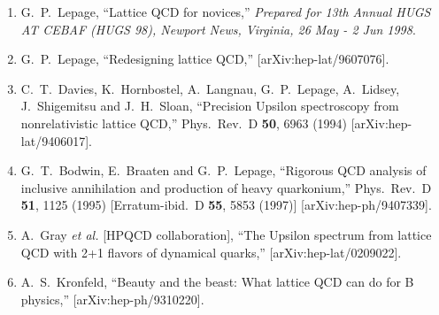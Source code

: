 \begin{slide*}

\slideframe{}
\Large

\begin{minipage}{\linewidth}


\vfill

\begin{flushleft}

\begin{enumerate}

  \item G.~P.~Lepage, ``Lattice QCD for novices,'' {\it Prepared for
  13th Annual HUGS AT CEBAF (HUGS 98), Newport News, Virginia, 26 May
  - 2 Jun 1998}.

  \item G.~P.~Lepage, ``Redesigning lattice QCD,''
  [arXiv:hep-lat/9607076].

  \item C.~T.~Davies, K.~Hornbostel, A.~Langnau, G.~P.~Lepage,
  A.~Lidsey, J.~Shigemitsu and J.~H.~Sloan, ``Precision Upsilon
  spectroscopy from nonrelativistic lattice QCD,'' Phys.\ Rev.\ D {\bf
  50}, 6963 (1994) [arXiv:hep-lat/9406017].

  \item G.~T.~Bodwin, E.~Braaten and G.~P.~Lepage, ``Rigorous QCD
  analysis of inclusive annihilation and production of heavy
  quarkonium,'' Phys.\ Rev.\ D {\bf 51}, 1125 (1995) [Erratum-ibid.\ D
  {\bf 55}, 5853 (1997)] [arXiv:hep-ph/9407339].

  \item A.~Gray {\it et al.} [HPQCD collaboration], ``The Upsilon
  spectrum from lattice QCD with 2+1 flavors of dynamical quarks,''
  [arXiv:hep-lat/0209022].

  \item A.~S.~Kronfeld, ``Beauty and the beast: What lattice QCD can
  do for B physics,'' [arXiv:hep-ph/9310220].

\end{enumerate}

\end{flushleft}

\end{minipage}

\end{slide*}










